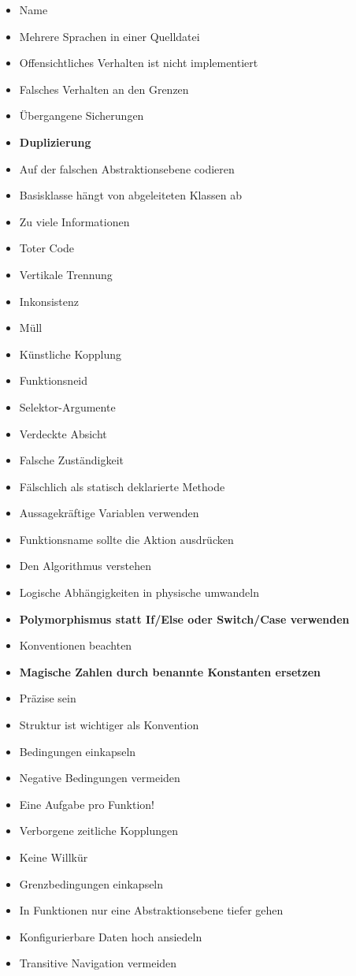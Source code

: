 \begin{itemize}
			\item Name
			\item Mehrere Sprachen in einer Quelldatei 
			\item Offensichtliches Verhalten ist nicht implementiert 
			\item Falsches Verhalten an den Grenzen 
			\item Übergangene Sicherungen 
			\item \textbf{Duplizierung} 
			\item Auf der falschen Abstraktionsebene codieren 
			\item Basisklasse hängt von abgeleiteten Klassen ab
			\item Zu viele Informationen 
			\item Toter Code 
			\item Vertikale Trennung 
			\item Inkonsistenz 
			\item Müll 
			\item Künstliche Kopplung 
			\item Funktionsneid 
			\item Selektor-Argumente 
			\item Verdeckte Absicht 
			\item Falsche Zuständigkeit 
			\item Fälschlich als statisch deklarierte Methode 
			\item Aussagekräftige Variablen verwenden 
			\item Funktionsname sollte die Aktion ausdrücken 
			\item Den Algorithmus verstehen 
			\item Logische Abhängigkeiten in physische umwandeln 
			\item \textbf{Polymorphismus statt If/Else oder Switch/Case verwenden}
			\item Konventionen beachten 
			\item \textbf{Magische Zahlen durch benannte Konstanten ersetzen}
			\item Präzise sein 
			\item Struktur ist wichtiger als Konvention 
			\item Bedingungen einkapseln 
			\item Negative Bedingungen vermeiden 
			\item Eine Aufgabe pro Funktion!
			\item Verborgene zeitliche Kopplungen 
			\item Keine Willkür 
			\item Grenzbedingungen einkapseln 
			\item In Funktionen nur eine Abstraktionsebene tiefer gehen 
			\item Konfigurierbare Daten hoch ansiedeln 
			\item Transitive Navigation vermeiden
\end{itemize}

